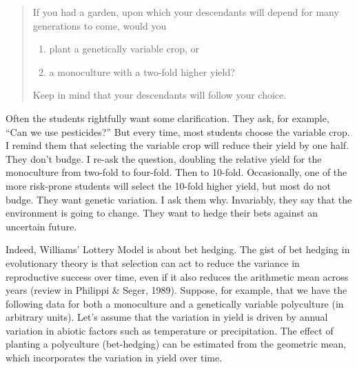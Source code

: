 \documentclass[
  letterpaper,
]{book}
\providecommand{\tightlist}{%
  \setlength{\itemsep}{0pt}\setlength{\parskip}{0pt}}\usepackage{longtable,booktabs,array}
\begin{document}
\begin{quote}
If you had a garden, upon which your descendants will depend for many
generations to come, would you

\begin{enumerate}
\def\labelenumi{\arabic{enumi}.}
\tightlist
\item
  plant a genetically variable crop, or
\item
  a monoculture with a two-fold higher yield?
\end{enumerate}

Keep in mind that your descendants will follow your choice.
\end{quote}

Often the students rightfully want some clarification. They ask, for
example, ``Can we use pesticides?'' But every time, most students choose
the variable crop. I remind them that selecting the variable crop will
reduce their yield by one half. They don't budge. I re-ask the question,
doubling the relative yield for the monoculture from two-fold to
four-fold. Then to 10-fold. Occasionally, one of the more risk-prone
students will select the 10-fold higher yield, but most do not budge.
They want genetic variation. I ask them why. Invariably, they say that
the environment is going to change. They want to hedge their bets
against an uncertain future.

Indeed, Williams' Lottery Model is about bet hedging. The gist of bet
hedging in evolutionary theory is that selection can act to reduce the
variance in reproductive success over time, even if it also reduces the
arithmetic mean across years (review in Philippi \& Seger, 1989).
Suppose, for example, that we have the following data for both a
monoculture and a genetically variable polyculture (in arbitrary units).
Let's assume that the variation in yield is driven by annual variation
in abiotic factors such as temperature or precipitation. The effect of
planting a polyculture (bet-hedging) can be estimated from the geometric
mean, which incorporates the variation in yield over time.
\end{document}

